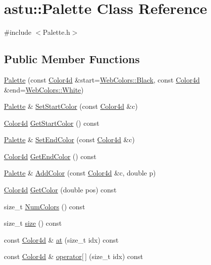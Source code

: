 \hypertarget{classastu_1_1Palette}{}\section{astu\+:\+:Palette Class Reference}
\label{classastu_1_1Palette}


{\ttfamily \#include $<$Palette.\+h$>$}

\subsection*{Public Member Functions}
\begin{DoxyCompactItemize}
\item 
\hyperlink{classastu_1_1Palette_af3a2786903a43f82307b4e47a424cc38}{Palette} (const \hyperlink{classastu_1_1Color}{Color4d} \&start=\hyperlink{classastu_1_1WebColors_ac75482e858498b1b3fa521ba93fcda98a915454255bdc03ff9d0fadee51ba3d50}{Web\+Colors\+::\+Black}, const \hyperlink{classastu_1_1Color}{Color4d} \&end=\hyperlink{classastu_1_1WebColors_ac75482e858498b1b3fa521ba93fcda98acc916d617a3ce8d3e4b9716bbdc231e5}{Web\+Colors\+::\+White})
\item 
\hyperlink{classastu_1_1Palette}{Palette} \& \hyperlink{classastu_1_1Palette_af32e6e54d464b2d999472ec1e39828c7}{Set\+Start\+Color} (const \hyperlink{classastu_1_1Color}{Color4d} \&c)
\item 
\hyperlink{classastu_1_1Color}{Color4d} \hyperlink{classastu_1_1Palette_aaee594ef9056e05b7032714e7de810a6}{Get\+Start\+Color} () const
\item 
\hyperlink{classastu_1_1Palette}{Palette} \& \hyperlink{classastu_1_1Palette_a6eadba10ea3611ce4c54129df75eadc7}{Set\+End\+Color} (const \hyperlink{classastu_1_1Color}{Color4d} \&c)
\item 
\hyperlink{classastu_1_1Color}{Color4d} \hyperlink{classastu_1_1Palette_aa67126acdc862688518f3aca13ecc80b}{Get\+End\+Color} () const
\item 
\hyperlink{classastu_1_1Palette}{Palette} \& \hyperlink{classastu_1_1Palette_a742c7531ae21206738af971d1987cb36}{Add\+Color} (const \hyperlink{classastu_1_1Color}{Color4d} \&c, double p)
\item 
\hyperlink{classastu_1_1Color}{Color4d} \hyperlink{classastu_1_1Palette_afc6cac18675f8441307b895dfcd0282e}{Get\+Color} (double pos) const
\item 
size\+\_\+t \hyperlink{classastu_1_1Palette_af99ff2f3a95466072070d6bb2b401587}{Num\+Colors} () const
\item 
size\+\_\+t \hyperlink{classastu_1_1Palette_a966a720d7f24685c88c8a711ad284488}{size} () const
\item 
const \hyperlink{classastu_1_1Color}{Color4d} \& \hyperlink{classastu_1_1Palette_a5cf0b8043184527e3a7ead5c03f1f741}{at} (size\+\_\+t idx) const
\item 
const \hyperlink{classastu_1_1Color}{Color4d} \& \hyperlink{classastu_1_1Palette_a1dccfd3d766edbbf64dabb010f9679e0}{operator\mbox{[}$\,$\mbox{]}} (size\+\_\+t idx) const
\end{DoxyCompactItemize}


